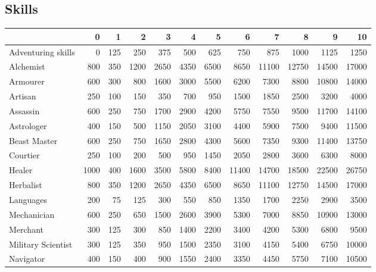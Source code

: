 \vfil

\pagebreak

\subsection{Skills}
\label{epcosts:skills}
{
\renewcommand{\thefootnote}{\Alph{footnote}}
\begin{tabularx}{\linewidth}{Xrrrrrrrrrrr}
& {\bf 0} & {\bf 1} & {\bf 2} &{\bf 3}&{\bf 4}&{\bf 5}&{\bf 6}&{\bf 7}&{\bf 8}& {\bf 9} & {\bf 10} \\
\hline Adventuring
skills\footnotemark[1] & 0 & 125 & 250 & 375 & 500 & 625 & 750 & 875 &1000 & 1125 & 1250 \\ \hline
Alchemist & 800 & 350 &1200 & 2650 & 4350& 6500 & 8650 & 11100 & 12750 & 14500 & 17000 \\ \hline
Armourer & 600& 300 & 800 & 1600 & 3000 & 5500 & 6200 & 7300 & 8800 & 10800 & 14000 \\ \hline
Artisan & 250 & 100 & 150 & 350 & 700 & 950 & 1500 & 1850 &2500 & 3200 & 4000 \\ \hline
Assassin & 600 & 250 & 750 & 1700 & 2900 & 4200 & 5750 & 7550 & 9500 & 11700 & 14100 \\ \hline
Astrologer & 400& 150 & 500 & 1150 & 2050 & 3100 & 4400 & 5900 & 7500 & 9400 & 11500 \\ \hline
Beast Master\footnotemark[2] & 600 & 250 & 750 & 1650 & 2800 & 4300 & 5600 & 7350 & 9300 & 11400 & 13750 \\ \hline
Courtier\footnotemark[3] & 250 & 100 & 200 & 500 & 950 & 1450 & 2050& 2800 & 3600 & 6300 & 8000 \\ \hline
Healer &1000 & 400 &1600 & 3500 & 5800 & 8400 &11400 & 14700 & 18500 & 22500 & 26750 \\ \hline
Herbalist & 800 & 350 &1200 & 2650 & 4350 & 6500 & 8650 & 11100 & 12750 & 14500 & 17000 \\ \hline
Languages & 200 & 75 & 125 & 300 & 550 & 850 & 1350 & 1700 & 2250 & 2900 & 3500 \\ \hline
Mechanician & 600 & 250 & 650 & 1500 & 2600 & 3900 & 5300 & 7000 & 8850 & 10900 & 13000 \\ \hline
Merchant\footnotemark[4]& 300 & 125 & 300 & 850 & 1400 & 2200 & 3400 & 4200 & 5300 & 6800 & 9500 \\ \hline
Military Scientist & 300 & 125 &350 & 950 & 1500 & 2350 & 3100 & 4150 & 5400 & 6750 & 10000 \\ \hline
Navigator & 400 & 150 & 400 & 900 & 1550 & 2400 & 3350 & 4450 & 5750 & 7100 & 10500 \\ \hline

\end{tabularx}}
